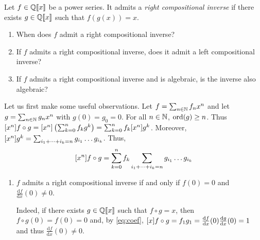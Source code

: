 \begin{exercise}
    Let $f \in \mathbb Q[\![x]\!]$ be a power series.
    It admits a \emph{right compositional inverse} if there exists $g
    \in \mathbb Q[\![x]\!]$ such that $f(g(x)) = x$.
    \begin{enumerate}
        \item When does $f$ admit a right compositional inverse?
        \item If $f$ admits a right compositional inverse, does it
            admit a left compositional inverse?
        \item If $f$ admits a right compositional inverse and is
            algebraic, is the inverse also algebraic?
    \end{enumerate}
\end{exercise}
\begin{solution}
    Let us first make some useful observations.
    Let $f = \sum_{n \in \mathbb N} f_n x^n$ and let $g = \sum_{n \in \mathbb N}
    g_n x^n$ with $g(0) = g_0 = 0$.
    For all $n \in \mathbb N$, $\mathrm{ord}(g) \geq n$.
    Thus $[x^n]f \circ g = [x^n]\left(\sum_{k = 0}^{n}
    f_k g^k\right) = \sum_{k = 0}^{n} f_k [x^n]g^k$.
    Moreover, $[x^n]g^k = \sum_{i_1 + \dots + i_k = n} g_{i_1}
    \dots g_{i_k}$.
    Thus,
    \begin{equation}\label{eq:coef}
        [x^n]f \circ g = \sum_{k = 0}^{n} f_k \sum_{i_1 +
        \dots + i_k = n} g_{i_1} \dots g_{i_k}
    \end{equation}
    \begin{enumerate}
        \item $f$ admits a right compositional inverse if and only if
            $f(0)=0$ and $\frac{\mathrm{d} f}{\mathrm{d} x}(0) \neq 0$.

            Indeed, if there exists $g \in \mathbb Q[\![x]\!]$ such
            that $f \circ g = x$, then $f \circ g (0) = f(0) = 0$
            and, by \eqref{eq:coef}, $[x]f \circ g = f_1 g_1 =
            \frac{\mathrm{d} f}{\mathrm{d} x}(0) \frac{\mathrm{d}
            g}{\mathrm{d} x}(0) = 1$ and thus $\frac{\mathrm{d}
            f}{\mathrm{d} x}(0) \neq 0$.


\end{enumerate}
\end{solution}
